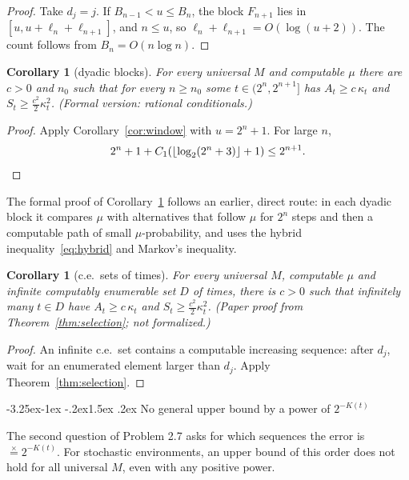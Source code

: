\documentclass[11pt]{article}
\makeatletter
\renewcommand\subsection{\@startsection{subsection}{2}{\z@}%
  {-3.25ex\@plus -1ex \@minus -.2ex}{1.5ex \@plus .2ex}%
  {\normalfont\large\bfseries\boldmath}}
\newcommand{\eqx}{\mathrel{\stackrel{\times}{=}}}
\newtheorem{corollary}[theorem]{Corollary}
\theoremstyle{definition}
\theoremstyle{remark}
\makeatother
\begin{document}
\begin{proof}
Take $d_j=j$. If $B_{n-1}<u\le B_n$, the block $F_{n+1}$ lies in
$[u,u+\ell_n+\ell_{n+1}]$, and $n\le u$, so
$\ell_n+\ell_{n+1}=O(\log(u+2))$. The count follows from
$B_n=O(n\log n)$.
\end{proof}

\begin{corollary}[dyadic blocks]\label{cor:dyadic}
For every universal $M$ and computable $\mu$ there are $c>0$ and $n_0$ such that
for every $n\ge n_0$ some $t\in(2^n,2^{n+1}]$ has $A_t\ge c\,\kappa_t$ and
$S_t\ge\frac{c^2}2\kappa_t^2$. (Formal version: rational conditionals.)
\end{corollary}

\begin{proof}
Apply Corollary~\ref{cor:window} with $u=2^n+1$. For large $n$,
\[
2^n+1+C_1(\lfloor\log_2(2^n+3)\rfloor+1)\le2^{n+1}.\qedhere
\]
\end{proof}

The formal proof of Corollary~\ref{cor:dyadic} follows an earlier, direct
route: in each dyadic block it compares $\mu$ with alternatives that follow
$\mu$ for $2^n$ steps and then a computable path of small $\mu$-probability,
and uses the hybrid inequality~\eqref{eq:hybrid} and Markov's inequality.

\begin{corollary}[c.e.\ sets of times]\label{cor:ce}
For every universal $M$, computable $\mu$ and infinite computably enumerable set
$D$ of times, there is $c>0$ such that infinitely many $t\in D$ have
$A_t\ge c\,\kappa_t$ and $S_t\ge\frac{c^2}2\kappa_t^2$. (Paper proof from
Theorem~\ref{thm:selection}; not formalized.)
\end{corollary}

\begin{proof}
An infinite c.e.\ set contains a computable increasing sequence: after $d_j$,
wait for an enumerated element larger than $d_j$. Apply
Theorem~\ref{thm:selection}.
\end{proof}

\subsection{No general upper bound by a power of $2^{-K(t)}$}

The second question of Problem 2.7 asks for which sequences the error is
$\eqx2^{-K(t)}$. For stochastic environments, an upper bound of this order does
not hold for all universal $M$, even with any positive power.
\end{document}
